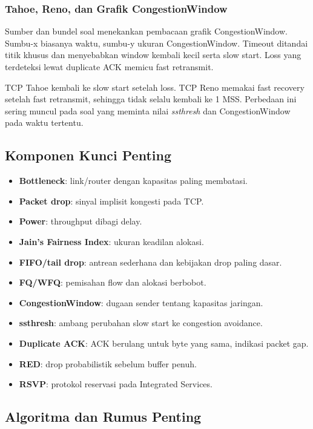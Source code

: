 \subsubsection*{Tahoe, Reno, dan Grafik CongestionWindow}

Sumber dan bundel soal menekankan pembacaan grafik CongestionWindow. Sumbu-x biasanya waktu, sumbu-y ukuran CongestionWindow. Timeout ditandai titik khusus dan menyebabkan window kembali kecil serta slow start. Loss yang terdeteksi lewat duplicate ACK memicu fast retransmit.

TCP Tahoe kembali ke slow start setelah loss. TCP Reno memakai fast recovery setelah fast retransmit, sehingga tidak selalu kembali ke 1 MSS. Perbedaan ini sering muncul pada soal yang meminta nilai \textit{ssthresh} dan CongestionWindow pada waktu tertentu.

\subsection{Komponen Kunci Penting}

\begin{itemize}
    \item \textbf{Bottleneck}: link/router dengan kapasitas paling membatasi.
    \item \textbf{Packet drop}: sinyal implisit kongesti pada TCP.
    \item \textbf{Power}: throughput dibagi delay.
    \item \textbf{Jain's Fairness Index}: ukuran keadilan alokasi.
    \item \textbf{FIFO/tail drop}: antrean sederhana dan kebijakan drop paling dasar.
    \item \textbf{FQ/WFQ}: pemisahan flow dan alokasi berbobot.
    \item \textbf{CongestionWindow}: dugaan sender tentang kapasitas jaringan.
    \item \textbf{ssthresh}: ambang perubahan slow start ke congestion avoidance.
    \item \textbf{Duplicate ACK}: ACK berulang untuk byte yang sama, indikasi packet gap.
    \item \textbf{RED}: drop probabilistik sebelum buffer penuh.
    \item \textbf{RSVP}: protokol reservasi pada Integrated Services.
\end{itemize}

\subsection{Algoritma dan Rumus Penting}

